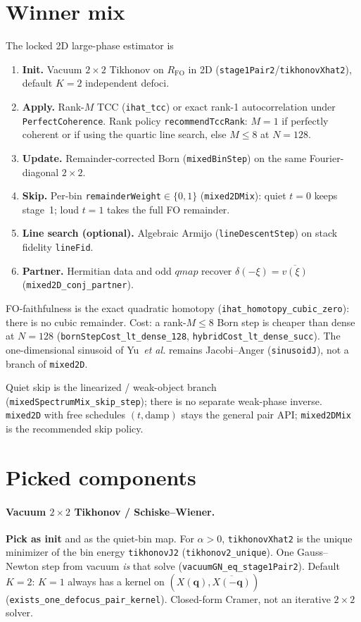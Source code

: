 \documentclass[11pt,a4paper]{article}
\theoremstyle{definition}
\theoremstyle{remark}
\newcommand{\conj}[1]{\overline{#1}}
\newcommand{\RFO}{R_{\mathrm{FO}}}
\begin{document}
\section{Winner mix}
\label{sec:winner}

The locked 2D large-phase estimator is
\begin{enumerate}[leftmargin=*]
\item \textbf{Init.} Vacuum $2\times 2$ Tikhonov on $\RFO$ in 2D
(\texttt{stage1Pair2}/\texttt{tikhonovXhat2}), default $K=2$
independent defoci.
\item \textbf{Apply.} Rank-$M$ TCC (\texttt{ihat\_tcc}) or exact
rank-1 autocorrelation under \texttt{PerfectCoherence}.
Rank policy \texttt{recommendTccRank}: $M=1$ if perfectly coherent
or if using the quartic line search, else $M\le 8$ at $N=128$.
\item \textbf{Update.} Remainder-corrected Born
(\texttt{mixedBinStep}) on the same Fourier-diagonal $2\times 2$.
\item \textbf{Skip.} Per-bin \texttt{remainderWeight}${}\in\{0,1\}$
(\texttt{mixed2DMix}): quiet $t=0$ keeps stage~1; loud $t=1$ takes
the full FO remainder.
\item \textbf{Line search (optional).} Algebraic Armijo
(\texttt{lineDescentStep}) on stack fidelity \texttt{lineFid}.
\item \textbf{Partner.} Hermitian data and odd $qmap$ recover
$\delta(-\xi)=\conj{v(\xi)}$ (\texttt{mixed2D\_conj\_partner}).
\end{enumerate}
FO-faithfulness is the exact quadratic homotopy
(\texttt{ihat\_homotopy\_cubic\_zero}): there is no cubic remainder.
Cost: a rank-$M\le 8$ Born step is cheaper than dense at $N=128$
(\texttt{bornStepCost\_lt\_dense\_128},
\texttt{hybridCost\_lt\_dense\_succ}).
The one-dimensional sinusoid of Yu~\emph{et al.} remains Jacobi--Anger
(\texttt{sinusoidJ}), not a branch of \texttt{mixed2D}.

Quiet skip is the linearized / weak-object branch
(\texttt{mixedSpectrumMix\_skip\_step}); there is no separate
weak-phase inverse.
\texttt{mixed2D} with free schedules $(t,\mathrm{damp})$ stays the
general pair API; \texttt{mixed2DMix} is the recommended skip policy.

\section{Picked components}
\label{sec:pick}

\paragraph{Vacuum $2\times 2$ Tikhonov / Schiske--Wiener.}
\textbf{Pick as init} and as the quiet-bin map.
For $\alpha>0$, \texttt{tikhonovXhat2} is the unique minimizer of the
bin energy \texttt{tikhonovJ2} (\texttt{tikhonov2\_unique}).
One Gauss--Newton step from vacuum \emph{is} that solve
(\texttt{vacuumGN\_eq\_stage1Pair2}).
Default $K=2$: $K=1$ always has a kernel on
$(X(\mathbf{q}),\conj{X(-\mathbf{q})})$
(\texttt{exists\_one\_defocus\_pair\_kernel}).
Closed-form Cramer, not an iterative $2\times 2$ solver.
\end{document}
